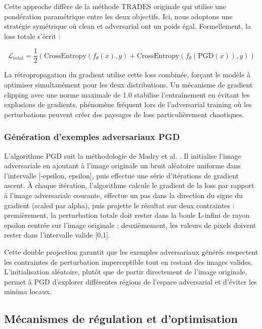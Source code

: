 Cette approche diffère de la méthode TRADES originale qui utilise une pondération paramétrique entre les deux objectifs. Ici, nous adoptons une stratégie symétrique où clean et adversarial ont un poids égal. Formellement, la loss totale s'écrit :

\begin{equation}
\mathcal{L}_{\text{total}} = \frac{1}{2}\left(\text{CrossEntropy}(f_\theta(x), y) + \text{CrossEntropy}(f_\theta(\text{PGD}(x)), y)\right)
\label{eq:adversarial_loss}
\end{equation}

La rétropropagation du gradient utilise cette loss combinée, forçant le modèle à optimiser simultanément pour les deux distributions. Un mécanisme de gradient clipping avec une norme maximale de 1.0 stabilise l'entraînement en évitant les explosions de gradients, phénomène fréquent lors de l'adversarial training où les perturbations peuvent créer des paysages de loss particulièrement chaotiques.

\subsubsection{Génération d'exemples adversariaux PGD}

L'algorithme PGD suit la méthodologie de Madry et al. \cite{madry2018towards}. Il initialise l'image adversariale en ajoutant à l'image originale un bruit aléatoire uniforme dans l'intervalle [-epsilon, epsilon], puis effectue une série d'itérations de gradient ascent. À chaque itération, l'algorithme calcule le gradient de la loss par rapport à l'image adversariale courante, effectue un pas dans la direction du signe du gradient (scaled par alpha), puis projette le résultat sur deux contraintes : premièrement, la perturbation totale doit rester dans la boule L-infini de rayon epsilon centrée sur l'image originale ; deuxièmement, les valeurs de pixels doivent rester dans l'intervalle valide [0,1].

Cette double projection garantit que les exemples adversariaux générés respectent les contraintes de perturbation imperceptible tout en restant des images valides. L'initialisation aléatoire, plutôt que de partir directement de l'image originale, permet à PGD d'explorer différentes régions de l'espace adversarial et d'éviter les minima locaux.

\subsection{Mécanismes de régulation et d'optimisation}

